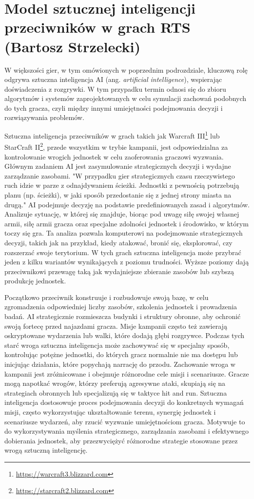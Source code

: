 \section{Model sztucznej inteligencji przeciwników w grach RTS (Bartosz Strzelecki)}\label{s:ai_wpr}
W większości gier, w tym omówionych w poprzednim podrozdziale, kluczową rolę odgrywa sztuczna inteligencja AI (ang.  \textit{artificial intelligence}), wspierając doświadczenia z rozgrywki.
W tym przypadku termin odnosi się do zbioru algorytmów i systemów zaprojektowanych w celu symulacji
zachowań podobnych do tych gracza, czyli między innymi umiejętności podejmowania decyzji i rozwiązywania problemów.

Sztuczna inteligencja przeciwników w grach takich jak Warcraft III\footnote{\url{https://warcraft3.blizzard.com}} lub StarCraft II\footnote{\url{https://starcraft2.blizzard.com}}, przede wszystkim w trybie kampanii,
jest odpowiedzialna za kontrolowanie wrogich jednostek w celu zaoferowania graczowi wyzwania. Głównym zadaniem AI jest zasymulowanie
strategicznych decyzji i wydajne zarządzanie zasobami.
"W przypadku gier strategicznych czasu rzeczywistego ruch idzie w parze z odnajdywaniem ścieżki. Jednostki z pewnością potrzebują planu (np. ścieżki), 
w jaki sposób przedostanie się z jednej strony miasta na drugą."\cite{units}
AI podejmuje decyzję na podstawie predefiniowanych zasad i algorytmów. Analizuje sytuację, w której się znajduje, biorąc pod uwagę
siłę swojej własnej armii, siłę armii gracza oraz specjalne zdolności jednostek i środowisko, w którym toczy się gra.
Ta analiza pozwala komputerowi na podejmowanie strategicznych decyzji, takich jak na przykład, kiedy atakować, bronić się, eksplorować, czy rozszerzać swoje terytorium.
W tych grach sztuczna inteligencja może przybrać jeden z kilku wariantów wynikających z poziomu trudności. Wyższe poziomy
dają przeciwnikowi przewagę taką jak wydajniejsze zbieranie zasobów lub szybszą produkcję jednostek.

Początkowo przeciwnik konstruuje i rozbudowuje swoją bazę, w celu zgromadzenia odpowiedniej liczby zasobów, szkolenia jednostek i prowadzenia badań.
AI strategicznie rozmieszcza budynki i struktury obronne, aby ochronić swoją fortecę przed najazdami gracza. 
Misje kampanii często też zawierają oskryptowane wydarzenia lub walki, które dodają głębi rozgrywce. Podczas tych starć wroga sztuczna inteligencja
może zachowywać się w specjalny sposób, kontrolując potężne jednostki, do których gracz normalnie nie ma dostępu lub inicjując działania, które popychają
narrację do przodu.
Zachowanie wroga w kampanii jest zróżnicowane i obejmuje różnorodne cele misji i scenariusze. Gracze mogą napotkać wrogów, którzy preferują agresywne ataki,
skupiają się na strategiach obronnych lub specjalizują się w taktyce hit and run. Sztuczna inteligencja dostosowuje proces podejmowania decyzji do
konkretnych wymagań misji, często wykorzystując ukształtowanie terenu, synergię jednostek i scenariusze wydarzeń, aby rzucić wyzwanie umiejętnościom gracza.
Motywuje to do wykorzystywania myślenia strategicznego, zarządzania zasobami i efektywnego dobierania jednostek, aby przezwyciężyć różnorodne strategie stosowane przez wrogą sztuczną inteligencję.

